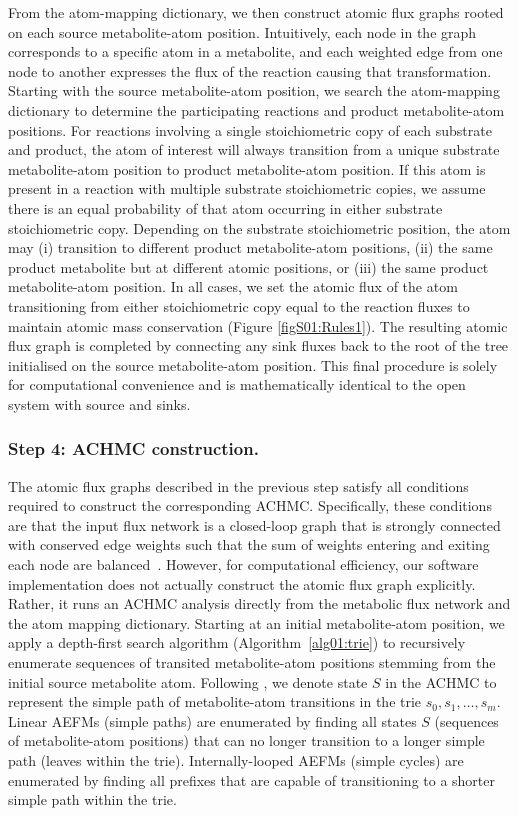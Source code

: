 \documentclass[12pt]{article}
\begin{document}
From the atom-mapping dictionary, we then construct atomic flux graphs
rooted on each source metabolite-atom position. Intuitively, each node in
the graph corresponds to a specific atom in a metabolite, and each
weighted edge from one node to another expresses the flux of the reaction
causing that transformation. Starting with the source metabolite-atom
position, we search the atom-mapping dictionary to determine the
participating reactions and product metabolite-atom positions. For
reactions involving a single stoichiometric copy of each substrate and
product, the atom of interest will always transition from a unique
substrate metabolite-atom position to product metabolite-atom position. If
this atom is present in a reaction with multiple substrate stoichiometric
copies, we assume there is an equal probability of that atom occurring in
either substrate stoichiometric copy. Depending on the substrate
stoichiometric position, the atom may (i) transition to different product
metabolite-atom positions, (ii) the same product metabolite but at
different atomic positions, or (iii) the same product metabolite-atom
position. In all cases, we set the atomic flux of the atom transitioning
from either stoichiometric copy equal to the reaction fluxes to maintain
atomic mass conservation (Figure {\ref{figS01:Rules1}}). The resulting
atomic flux graph is completed by connecting any sink fluxes back to the
root of the tree initialised on the source metabolite-atom position. This
final procedure is solely for computational convenience and is
mathematically identical to the open system with source and sinks.

\subsubsection*{Step 4: ACHMC construction.}

The atomic flux graphs described in the previous step satisfy all
conditions required to construct the corresponding ACHMC. Specifically,
these conditions are that the input flux network is a closed-loop graph
that is strongly connected with conserved edge weights such that the sum
of weights entering and exiting each node are
balanced~\citep{ChitpinJustinG2023AMct}. However, for computational
efficiency, our software implementation does not actually construct the
atomic flux graph explicitly. Rather, it runs an ACHMC analysis directly
from the metabolic flux network and the atom mapping dictionary. Starting
at an initial metabolite-atom position, we apply a depth-first search
algorithm (Algorithm~{\ref{alg01:trie}}) to recursively enumerate
sequences of transited metabolite-atom positions stemming from the initial
source metabolite atom. Following \citeauthor{ChitpinJustinG2023AMct}, we
denote state $S$ in the ACHMC to represent the simple path of
metabolite-atom transitions in the trie $s_0, s_1, \ldots, s_m$. Linear
AEFMs (simple paths) are enumerated by finding all states $S$ (sequences
of metabolite-atom positions) that can no longer transition to a longer
simple path (leaves within the trie). Internally-looped AEFMs (simple
cycles) are enumerated by finding all prefixes that are capable of
transitioning to a shorter simple path within the trie.
\end{document}
